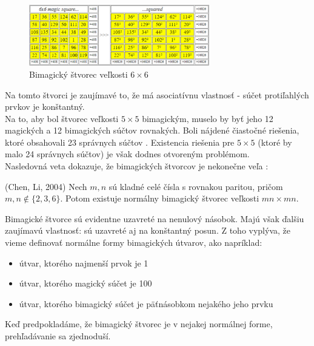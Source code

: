 \begin{figure}[H]
\centerline{\includegraphics[width=0.7\textwidth]{images/wroblewski_bimagic_6x6}}
\caption[Bimagický štvorec veľkosti $6 \times 6$]{Bimagický štvorec veľkosti $6 \times 6$ \cite{multimagie}}
\label{obr:fig_wroblewski_bimagic_6x6}
\end{figure}

Na tomto štvorci je zaujímavé to, že má asociatívnu vlastnosť - súčet protiľahlých prvkov je konštantný. \\

Na to, aby bol štvorec veľkosti $5 \times 5$ bimagickým, muselo by byť jeho 12 magických a 12 bimagických súčtov rovnakých. Boli nájdené čiastočné riešenia, ktoré obsahovali 23 správnych súčtov \cite{multimagie}. Existencia riešenia pre $5 \times 5$ (ktoré by malo 24 správnych súčtov) je však dodnes otvoreným problémom. \\

Nasledovná veta dokazuje, že bimagických štvorcov je nekonečne veľa \cite{bimagic}:

\begin{theorem} (Chen, Li, 2004) Nech $m,n$ sú kladné celé čísla s rovnakou paritou, pričom $m,n \notin \{2,3,6\}$. Potom existuje normálny bimagický štvorec veľkosti $mn \times mn$.
\end{theorem}

Bimagické štvorce sú evidentne uzavreté na nenulový násobok. Majú však ďalšiu zaujímavú vlastnosť: sú uzavreté aj na konštantný posun. Z toho vyplýva, že vieme definovať normálne formy bimagických útvarov, ako napríklad:
\begin{itemize}
\item útvar, ktorého najmenší prvok je 1
\item útvar, ktorého magický súčet je 100
\item útvar, ktorého bimagický súčet je päťnásobkom nejakého jeho prvku
\end{itemize}

Keď predpokladáme, že bimagický štvorec je v nejakej normálnej forme, prehľadávanie sa zjednoduší. \\

